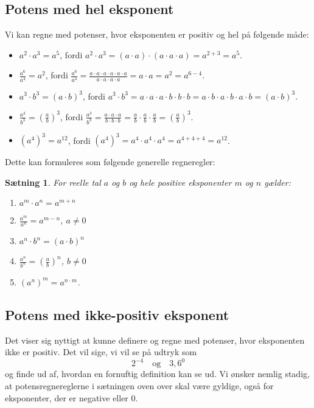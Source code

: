 \documentclass[12pt,oneside,a4paper]{article}
\theoremstyle{plain}
\newtheorem*{thm}{Sætning}
\begin{document}
\subsection*{Potens med hel eksponent}
Vi kan regne med potenser, hvor eksponenten er positiv og hel på følgende måde:
\begin{itemize}
    \item $a^2 \cdot a^3 = a^5$, fordi $a^2\cdot a^3 = (a\cdot a)\cdot (a \cdot
        a\cdot a) = a^{2+3} = a^5$.
    \item $\frac{a^6}{a^4} = a^2$, fordi $\frac{a^6}{a^4} = \frac{a \cdot a
        \cdot a\cdot a\cdot a\cdot a}{a\cdot a\cdot a\cdot a} = a\cdot a = a^2
        = a^{6-4}$.
    \item $a^3\cdot b^3 = (a\cdot b)^3$, fordi $a^3 \cdot b^3 = a\cdot a\cdot
        a\cdot b\cdot b\cdot b = a\cdot b\cdot a\cdot b\cdot a\cdot b = (a\cdot
        b)^3$.
    \item $\frac{a^3}{b^3} = \left(\frac{a}{b}\right)^3$, fordi
        $\frac{a^3}{b^3} = \frac{a\cdot a\cdot a}{b\cdot b\cdot b} =
        \frac{a}{b} \cdot \frac{a}{b} \cdot \frac{a}{b} =
        \left(\frac{a}{b}\right)^3$.
    \item $(a^4)^3 = a^{12}$, fordi $(a^4)^3 = a^4\cdot a^4 \cdot a^4 =
        a^{4+4+4} = a^{12}$.
\end{itemize}
Dette kan formuleres som følgende generelle regneregler:
\begin{thm}
    For reelle tal $a$ og $b$ og hele positive eksponenter $m$ og $n$ gælder:
    
    \begin{enumerate}
        \item $a^m \cdot a^n = a^{m+n}$
        \item $\frac{a^m}{a^n} = a^{m-n}$, \quad $a\neq 0$
        \item $a^n\cdot b^n = (a\cdot b)^n$
        \item $\frac{a^n}{b^n} = \left(\frac{a}{b}\right)^n$, \quad $b\neq 0$
        \item $(a^n)^m = a^{n\cdot m}$.
    \end{enumerate}
\end{thm}

\subsection*{Potens med ikke-positiv eksponent}
Det viser sig nyttigt at kunne definere og regne med potenser, hvor eksponenten
ikke er positiv. Det vil sige, vi vil se på udtryk som 
$$
2^{-4}\quad \mbox{og} \quad 3,6^0
$$
og finde ud af, hvordan en fornuftig definition kan se ud. Vi ønsker nemlig
stadig, at potensregnereglerne i sætningen oven over skal være gyldige, også
for eksponenter, der er negative eller 0.
\end{document}
